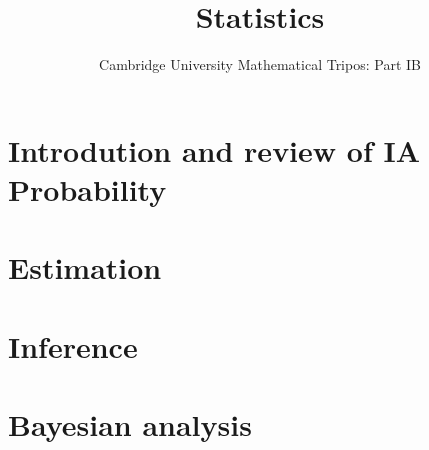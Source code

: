 \documentclass{article}
\title{Statistics}
\author{Cambridge University Mathematical Tripos: Part IB}
\begin{document}
\maketitle

\tableofcontentsnewpage{}

\section{Introdution and review of IA Probability}

\section{Estimation}

\section{Inference}

\section{Bayesian analysis}

\end{document}
